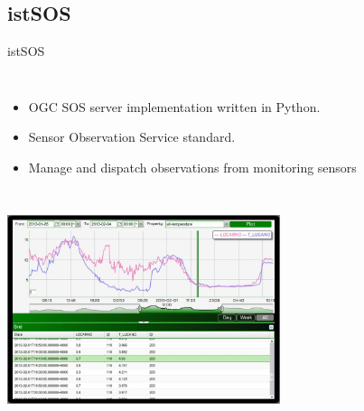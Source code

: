 \documentclass[xcolor=dvipsnames,beamer]{beamer} %
\begin{document}
\subsection{istSOS}
\begin{frame}[fragile]{istSOS}

\begin{columns}
 \begin{itemize}
  \item OGC SOS server implementation written in Python.
  \item Sensor Observation Service standard.
  \item Manage and dispatch observations from monitoring sensors
 \end{itemize}
 
\end{columns}

\begin{flushright}
  \includegraphics[width=8cm]{istsos3}
\end{flushright}



\end{frame}
\end{document}
